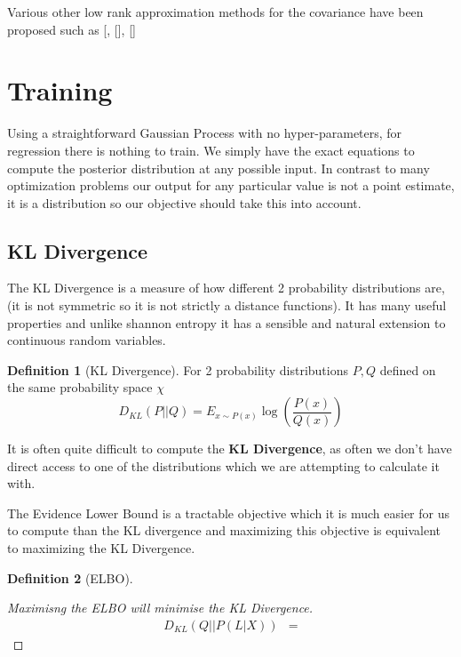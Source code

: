\documentclass[12pt, a4paper]{report}
\theoremstyle{definition}
\theoremstyle{definition}
\newtheorem{definition}{Definition}[section]
\theoremstyle{definition}
\begin{document}
Various other low rank approximation methods for the covariance have been proposed such as [, [], []



\section{Training}

Using a straightforward Gaussian Process with no hyper-parameters, for regression there is nothing to train. We simply have the exact equations to compute the posterior distribution at any possible input. In contrast to many optimization problems our output for any particular value is not a point estimate, it is a distribution so our objective should take this into account.


\subsection{KL Divergence}

The KL Divergence is a measure of how different 2 probability distributions are, (it is not symmetric so it is not strictly a distance functions). It has many useful properties and unlike shannon entropy it has a sensible and natural extension to continuous random variables.

\begin{definition}[KL Divergence]
    For 2 probability distributions $P, Q$ defined on the same probability space $\chi$
    $$D_{KL} \left( P || Q \right) = E_{x \sim P(x)}  \log \left( \frac{P(x)}{Q(x)}\right)$$
\end{definition}



It is often quite difficult to compute the \textbf{KL Divergence}, as often we don't have direct access to one of the distributions which we are attempting to calculate it with.

The Evidence Lower Bound is a tractable objective which it is much easier for us to compute than the KL divergence and maximizing this objective is equivalent to maximizing the KL Divergence.

\begin{definition}[ELBO]
    
\end{definition}


\begin{proof}[Maximisng the ELBO will minimise the KL Divergence]
    \begin{align*}
        D_{KL} \left( Q || P \left(L | X\right) \right) &= 
    \end{align*}
\end{proof}
\end{document}
